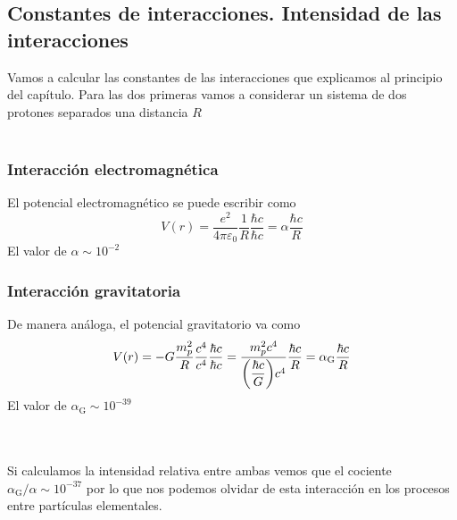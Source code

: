 \subsection{Constantes de interacciones. Intensidad de las interacciones}
Vamos a calcular las constantes de las interacciones que explicamos al principio del capítulo. Para las dos primeras vamos a considerar un sistema de dos protones separados una distancia $R$\\\\
\noindent
\begin{minipage}{0.4\textwidth}
    \subsubsection{Interacción electromagnética}
El potencial electromagnético se puede escribir como
\begin{equation*}
    V(r)=\frac{e^2}{4\pi \varepsilon_0 } \frac{1}{R} \frac{\hbar c}{\hbar c}= \alpha \frac{\hbar c}{R}
\end{equation*}
El valor de $\alpha\sim 10^{-2}$
\end{minipage}
\hfill
\begin{minipage}{0.5\textwidth}
    \subsubsection{Interacción gravitatoria}
De manera análoga, el potencial gravitatorio va como
\begin{equation*}
    V(r)=- G\frac{m_p^2}{R}\frac{c^4}{c^4} \frac{\hbar c}{\hbar c}=\frac{m_p^2c^4}{\qty(\dfrac{\hbar c}{G})c^4}\frac{\hbar c}{R}=\alpha_\mathrm{G}\frac{\hbar c}{R} 
\end{equation*}
El valor de $\alpha_\mathrm{G}\sim 10^{-39}$
\end{minipage}\\\\
Si calculamos la intensidad relativa entre ambas vemos que el cociente $\alpha_\mathrm{G}/\alpha\sim 10^{-37}$ por lo que nos podemos olvidar de esta interacción en los procesos entre partículas elementales.

